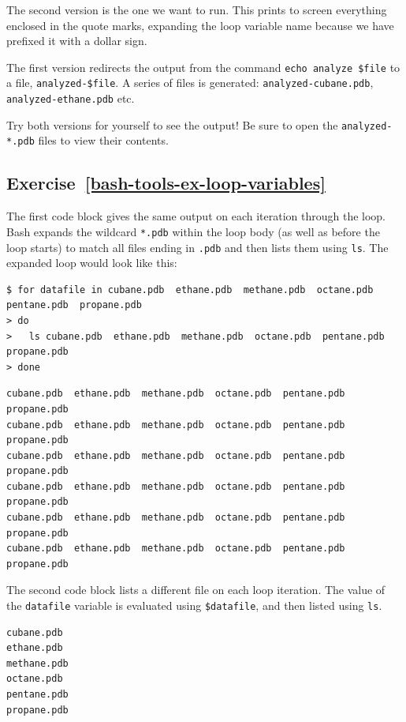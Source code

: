 \documentclass[
]{krantz}
\begin{document}
The second version is the one we want to run.
This prints to screen everything enclosed in the quote marks, expanding the
loop variable name because we have prefixed it with a dollar sign.

The first version redirects the output from the command \texttt{echo\ analyze\ \$file} to
a file, \texttt{analyzed-\$file}. A series of files is generated: \texttt{analyzed-cubane.pdb},
\texttt{analyzed-ethane.pdb} etc.

Try both versions for yourself to see the output! Be sure to open the
\texttt{analyzed-*.pdb} files to view their contents.

\hypertarget{exercise-refbash-tools-ex-loop-variables}{%
\subsection*{Exercise~\ref{bash-tools-ex-loop-variables}}\label{exercise-refbash-tools-ex-loop-variables}}


The first code block gives the same output on each iteration through
the loop.
Bash expands the wildcard \texttt{*.pdb} within the loop body (as well as
before the loop starts) to match all files ending in \texttt{.pdb}
and then lists them using \texttt{ls}.
The expanded loop would look like this:

\begin{verbatim}
$ for datafile in cubane.pdb  ethane.pdb  methane.pdb  octane.pdb  pentane.pdb  propane.pdb
> do
>   ls cubane.pdb  ethane.pdb  methane.pdb  octane.pdb  pentane.pdb  propane.pdb
> done
\end{verbatim}

\begin{verbatim}
cubane.pdb  ethane.pdb  methane.pdb  octane.pdb  pentane.pdb  propane.pdb
cubane.pdb  ethane.pdb  methane.pdb  octane.pdb  pentane.pdb  propane.pdb
cubane.pdb  ethane.pdb  methane.pdb  octane.pdb  pentane.pdb  propane.pdb
cubane.pdb  ethane.pdb  methane.pdb  octane.pdb  pentane.pdb  propane.pdb
cubane.pdb  ethane.pdb  methane.pdb  octane.pdb  pentane.pdb  propane.pdb
cubane.pdb  ethane.pdb  methane.pdb  octane.pdb  pentane.pdb  propane.pdb
\end{verbatim}

The second code block lists a different file on each loop iteration.
The value of the \texttt{datafile} variable is evaluated using \texttt{\$datafile},
and then listed using \texttt{ls}.

\begin{verbatim}
cubane.pdb
ethane.pdb
methane.pdb
octane.pdb
pentane.pdb
propane.pdb
\end{verbatim}
\end{document}
